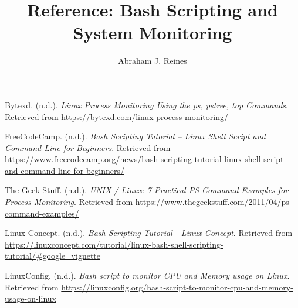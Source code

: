 \documentclass[12pt]{article}
\title{Reference: Bash Scripting and System Monitoring}
\author{Abraham J. Reines}
\date{}
\begin{document}
\maketitle

\begin{thebibliography}{9}
Bytexd. (n.d.). \textit{Linux Process Monitoring Using the ps, pstree, top Commands}. Retrieved from \url{https://bytexd.com/linux-process-monitoring/}

FreeCodeCamp. (n.d.). \textit{Bash Scripting Tutorial – Linux Shell Script and Command Line for Beginners}. Retrieved from \url{https://www.freecodecamp.org/news/bash-scripting-tutorial-linux-shell-script-and-command-line-for-beginners/}

The Geek Stuff. (n.d.). \textit{UNIX / Linux: 7 Practical PS Command Examples for Process Monitoring}. Retrieved from \url{https://www.thegeekstuff.com/2011/04/ps-command-examples/}

Linux Concept. (n.d.). \textit{Bash Scripting Tutorial - Linux Concept}. Retrieved from \url{https://linuxconcept.com/tutorial/linux-bash-shell-scripting-tutorial/#google_vignette}

LinuxConfig. (n.d.). \textit{Bash script to monitor CPU and Memory usage on Linux}. Retrieved from \url{https://linuxconfig.org/bash-script-to-monitor-cpu-and-memory-usage-on-linux}

\end{thebibliography}
\end{document}
